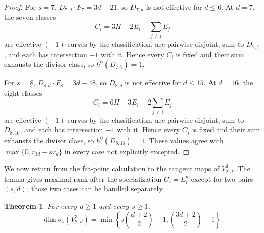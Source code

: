 \documentclass[11pt]{amsart}
\newtheorem{theorem}{Theorem}[section]
\theoremstyle{remark}
\begin{document}
\begin{proof}
For $s=7$, $D_{7,d}\cdot F_7=3d-21$, so $D_{7,d}$ is not effective for $d\le6$. At $d=7$, the seven classes
$$
C_i=3H-2E_i-\sum_{j\ne i}E_j
$$
are effective $(-1)$-curves by the classification, are pairwise disjoint, sum to $D_{7,7}$, and each has intersection $-1$ with it. Hence every $C_i$ is fixed and their sum exhausts the divisor class, so $h^0(D_{7,7})=1$.

For $s=8$, $D_{8,d}\cdot F_8=3d-48$, so $D_{8,d}$ is not effective for $d\le15$. At $d=16$, the eight classes
$$
C_i=6H-3E_i-2\sum_{j\ne i}E_j
$$
are effective $(-1)$-curves by the classification, are pairwise disjoint, sum to $D_{8,16}$, and each has intersection $-1$ with it. Hence every $C_i$ is fixed and their sum exhausts the divisor class, so $h^0(D_{8,16})=1$. These values agree with $\max\{0,r_{3d}-sr_d\}$ in every case not explicitly excepted.
\end{proof}

We now return from the fat-point calculation to the tangent maps of $V^3_{2,d}$. The lemma gives maximal rank after the specialization $G_i=L_i^d$ except for two pairs $(s,d)$; those two cases can be handled separately.

\begin{theorem}\label{thm:ternary-cubes-all}
For every $d\ge1$ and every $s\ge1$,
$$
\dim\sigma_s(V^3_{2,d})
=
\min\left\{
 s\binom{d+2}{2}-1,
 \binom{3d+2}{2}-1
\right\}.
$$
\end{theorem}
\end{document}
